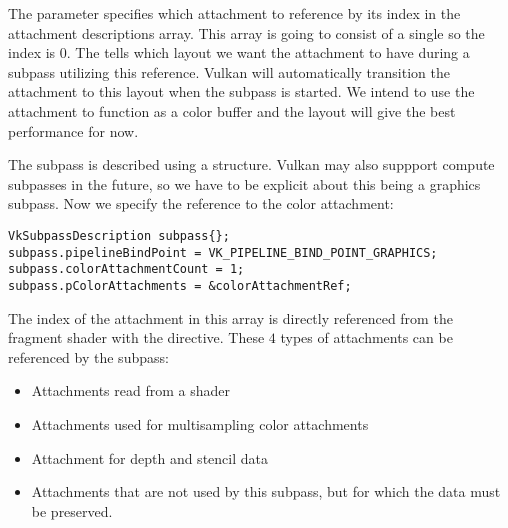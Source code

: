 \par The  parameter specifies which attachment to reference by its index in the attachment descriptions array. This array is going to consist of a single  so the index is $0$. The  tells which layout we want the attachment to have during a subpass utilizing this reference. Vulkan will automatically transition the attachment to this layout when the subpass is started. We intend to use the attachment to function as a color buffer and the  layout will give the best performance for now. 

\par The subpass is described using a  structure. Vulkan may also suppport compute subpasses in the future, so we have to be explicit about this being a graphics subpass. Now we specify the reference to the color attachment:

\begin{center}
\begin{minipage}{0.95\linewidth}
\begin{lstlisting}
VkSubpassDescription subpass{};
subpass.pipelineBindPoint = VK_PIPELINE_BIND_POINT_GRAPHICS;
subpass.colorAttachmentCount = 1;
subpass.pColorAttachments = &colorAttachmentRef;
\end{lstlisting}
\end{minipage}
\end{center}

\par The index of the attachment in this array is directly referenced from the fragment shader with the  directive. These $4$ types of attachments can be referenced by the subpass:

\begin{itemize}
    \item {} Attachments read from a shader
    \item {} Attachments used for multisampling color attachments
    \item {} Attachment for depth and stencil data
    \item {} Attachments that are not used by this subpass, but for which the data must be preserved.
\end{itemize}

